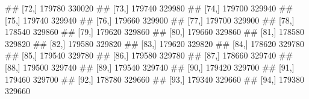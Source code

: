 \documentclass[11pt,ignorenonframetext,]{beamer}
\newenvironment{Shaded}{}{}
\newcommand{\NormalTok}[1]{#1}
\let\oldShaded\Shaded
\let\endoldShaded\endShaded
\renewenvironment{Shaded}{\footnotesize\begin{spacing}{0.9}\oldShaded}{\endoldShaded\end{spacing}}
\begin{document}
\begin{frame}[fragile,t]{}
\begin{Shaded}
\begin{Highlighting}[]
\NormalTok{## [72,] 179780 330020}
\NormalTok{## [73,] 179740 329980}
\NormalTok{## [74,] 179700 329940}
\NormalTok{## [75,] 179740 329940}
\NormalTok{## [76,] 179660 329900}
\NormalTok{## [77,] 179700 329900}
\NormalTok{## [78,] 178540 329860}
\NormalTok{## [79,] 179620 329860}
\NormalTok{## [80,] 179660 329860}
\NormalTok{## [81,] 178580 329820}
\NormalTok{## [82,] 179580 329820}
\NormalTok{## [83,] 179620 329820}
\NormalTok{## [84,] 178620 329780}
\NormalTok{## [85,] 179540 329780}
\NormalTok{## [86,] 179580 329780}
\NormalTok{## [87,] 178660 329740}
\NormalTok{## [88,] 179500 329740}
\NormalTok{## [89,] 179540 329740}
\NormalTok{## [90,] 179420 329700}
\NormalTok{## [91,] 179460 329700}
\NormalTok{## [92,] 178780 329660}
\NormalTok{## [93,] 179340 329660}
\NormalTok{## [94,] 179380 329660}
\end{Highlighting}
\end{Shaded}

\end{frame}
\end{document}
